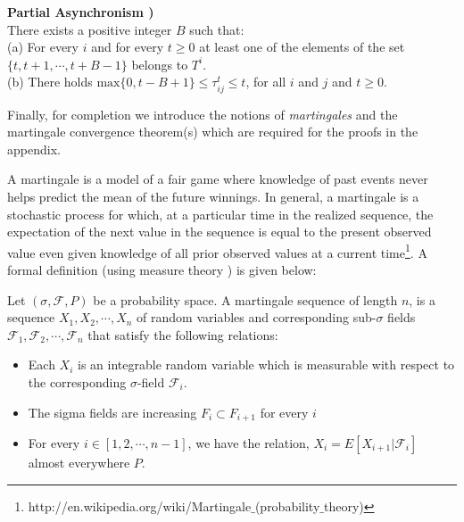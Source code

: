 \begin{asm}

\noindent \textbf{Partial Asynchronism \cite{Bertsekas_97})} \\
There exists a positive integer $B$ such that: \\
(a) For every $i$ and for every $t \ge 0$ at least one of the elements of the set $\{t,t+1,\cdots,t+B-1\}$ belongs to $T^i$. \\
(b) There holds $\text{max}\{0,t-B+1\} \le \tau_{ij}^t \le t$, for all $i$ and $j$ and $t \ge 0$.
\end{asm}
\noindent Finally, for completion we introduce the notions of \emph{martingales} and the martingale convergence theorem(s) which are required for the proofs in the appendix. 

A martingale is a model of a fair game where knowledge of past events never helps predict the mean of the future winnings. In general, a martingale is a stochastic process for which, at a particular time in the realized sequence, the expectation of the next value in the sequence is equal to the present observed value even given knowledge of all prior observed values at a current time\footnote{http://en.wikipedia.org/wiki/Martingale$\_$(probability$\_$theory)}. A formal definition (using measure theory \cite{Tao_11}) is given below:

Let $(\sigma, \mathcal{F}, P)$ be a probability space. A martingale sequence of length $n$, is a sequence $X_1, X_2, \cdots, X_n$ of random variables and corresponding sub-$\sigma$ fields $\mathcal{F}_1, \mathcal{F}_2, \cdots, \mathcal{F}_n$ that satisfy the following relations:
\begin{itemize}
\item Each $X_i$ is an integrable random variable which is measurable with respect to the corresponding $\sigma$-field $\mathcal{F}_i$.
\item The sigma fields are increasing $F_i \subset F_{i+1}$ for every $i$
\item For every  $i \in [1,2,\cdots,n-1]$, we have the relation, $X_i = E[X_{i+1}|\mathcal{F}_i]$ almost everywhere $P$. 
\end{itemize}

